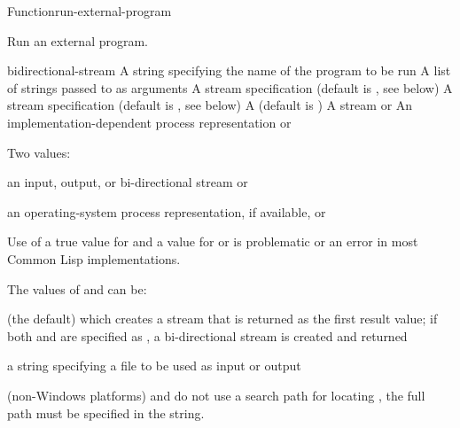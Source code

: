 \documentclass[10pt,twoside,english,pdftex]{article}
\begin{document}
\begin{functiondoc}{Function}{run-external-program}{
    }
%
%

\fnsyntax

\fnpurpose Run an external program.

\fnpackage {}

\fnmodule {}

\fnargs
\begin{args}{bidirectional-stream}
\arg[program] A string specifying the name of the program to be run
\arg[args] A list of strings passed to  as arguments
\arg[input] A stream specification (default is , 
see below)
\arg[output] A stream specification (default is ,
see below)
\arg[wait] A  (default is \nil)
 A stream or \nil{}
\arg[os-process] An implementation-dependent process representation or \nil{}
\end{args}

\fnreturns Two values:
\begin{tightitemize}
\item an input, output, or bi-directional stream or \nil{}
\item an operating-system process representation, if available, or \nil{}
\end{tightitemize}
  
\fnerrors Use of a true value for  and a 
value for  or  is problematic or an error in most
Common Lisp implementations.

\fndescription
The values of  and  can be:
\begin{tightitemize}
\item {} (the default) which creates a stream that is returned as
  the first result value; if both  and  are
  specified as , a bi-directional stream is created and
  returned
\item a string specifying a file to be used as input or output
\end{tightitemize}

 (non-Windows platforms) and
 do not use a search path for
locating , the full path must be specified in the 
string.


\end{functiondoc}
\end{document}
